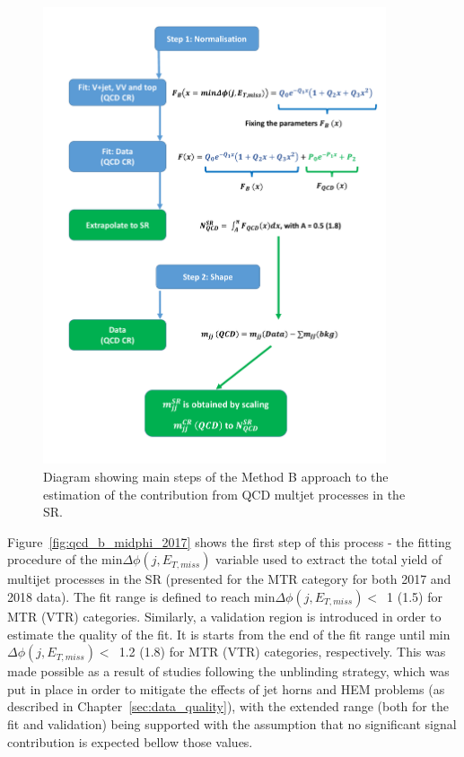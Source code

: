 \begin{figure}[htbp]
  \centering
  \includegraphics[width= 0.9\textwidth]{Control_Regions/QCD_diagram.pdf}
  \caption{Diagram showing main steps of the Method B approach to the estimation of the contribution from QCD multjet processes in the SR.}
  \label{fig:qcd_diag}
\end{figure}


\hspace{10pt} Figure~\ref{fig:qcd_b_midphi_2017} shows the first step of this process - the fitting procedure of the min$\Delta \phi (j, E_{T,miss})$ variable used to extract the total yield of multijet processes in the SR (presented for the MTR category for both 2017 and 2018 data). The fit range is defined to reach min$\Delta \phi (j, E_{T,miss})<$~1 (1.5) for MTR (VTR) categories. Similarly, a validation region is introduced in order to estimate the quality of the fit. It is starts from the end of the fit range until  min$\Delta \phi (j, E_{T,miss})<$~1.2 (1.8) for MTR (VTR) categories, respectively. This was made possible as a result of studies following the unblinding strategy, which was put in place in order to mitigate the effects of jet horns and HEM problems (as described in Chapter~\ref{sec:data_quality}), with the extended range (both for the fit and validation) being supported with the assumption that no significant signal contribution is expected bellow those values. 

